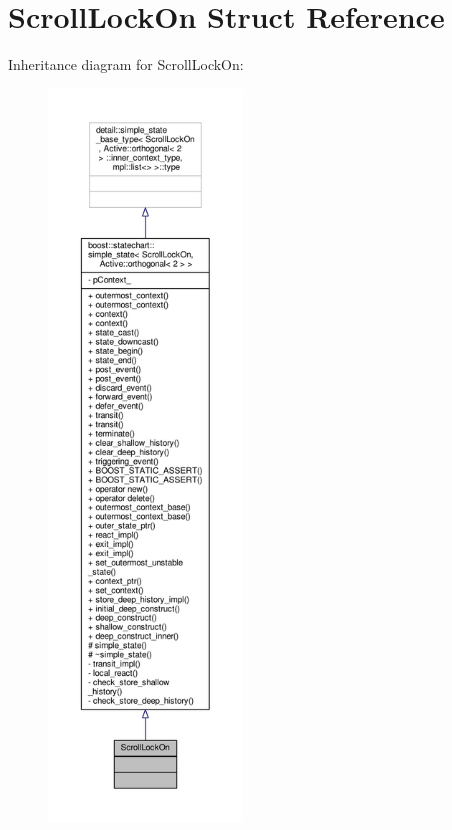 \hypertarget{struct_scroll_lock_on}{}\section{Scroll\+Lock\+On Struct Reference}
\label{struct_scroll_lock_on}


Inheritance diagram for Scroll\+Lock\+On\+:
\nopagebreak
\begin{figure}[H]
\begin{center}
\leavevmode
\includegraphics[height=550pt]{struct_scroll_lock_on__inherit__graph}
\end{center}
\end{figure}


